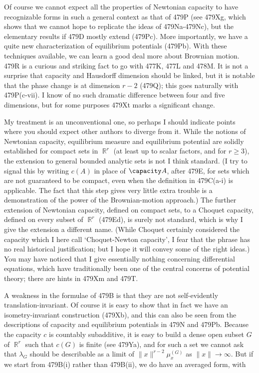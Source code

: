 {Of course we cannot expect all the properties of
Newtonian capacity to have recognizable forms in such a general context
as that of 479P
(see 479Xg, which shows that we cannot hope to replicate the ideas of
479Na-479Nc), but the elementary results if 479D mostly extend (479Pc).
More importantly, we have a quite new characterization of
equilibrium potentials (479Pb).
With these techniques available, we can learn a good deal more about
Brownian motion.   479R is a curious
and striking fact to go with 477K, 477L and 478M.   It is not a surprise
that capacity and Hausdorff dimension should be linked, but it is notable
that the phase change is at dimension $r-2$ (479Q);  this goes naturally
with 479P(c-vii).   I know of no such dramatic difference between four and
five dimensions, but for some purposes 479Xt marks a significant change.

My treatment is an unconventional one, so perhaps I should indicate points
where you should expect other authors to diverge from it.
While the notions of Newtonian
capacity, equilibrium measure and equilibrium potential are solidly
established for compact sets in $\BbbR^r$ (at least up to scalar factors,
and for $r\ge 3$),
the extension to general bounded analytic sets is not I think standard.
(I try to signal this by writing $c(A)$ in place of $\capacity A$, after
479E, for sets which are not guaranteed to be compact, even when the
definition in 479C(a-i) is applicable.
The fact that this step gives very little extra trouble is a
demonstration of the power of the Brownian-motion approach.)   The
further extension of Newtonian
capacity, defined on compact sets, to a Choquet capacity, defined on every
subset of $\BbbR^r$ (479Ed), is surely not standard, which is why I
give the extension a different name.   (While Choquet certainly
considered the capacity which I here call `Choquet-Newton capacity', I
fear that the phrase has no real historical justification;
but I hope it will convey some of the right ideas.)
You may have noticed that I
give essentially nothing concerning differential equations, which have
traditionally been one of the central concerns of potential theory;  there
are hints in 479Xm and 479T.

A weakness in the formulae of 479B is that
they are not self-evidently translation-invariant.   Of course it is
easy to show that in fact we have an isometry-invariant construction
(479Xb), and this can also be seen from the descriptions of capacity
and equilibrium potentials in 479N and 479Pb.
Because the capacity $c$ is countably subadditive,
it is easy to build a dense open subset $G$ of $\BbbR^r$ such that
$c(G)$ is finite (see 479Ya), and for such a set we cannot ask that
$\lambda_G$ should be
describable as a limit of $\|x\|^{r-2}\mu_x^{(G)}$ as $\|x\|\to\infty$.
But if we start from 479B(i) rather than 479B(ii), we do have an averaged
form, with

}
